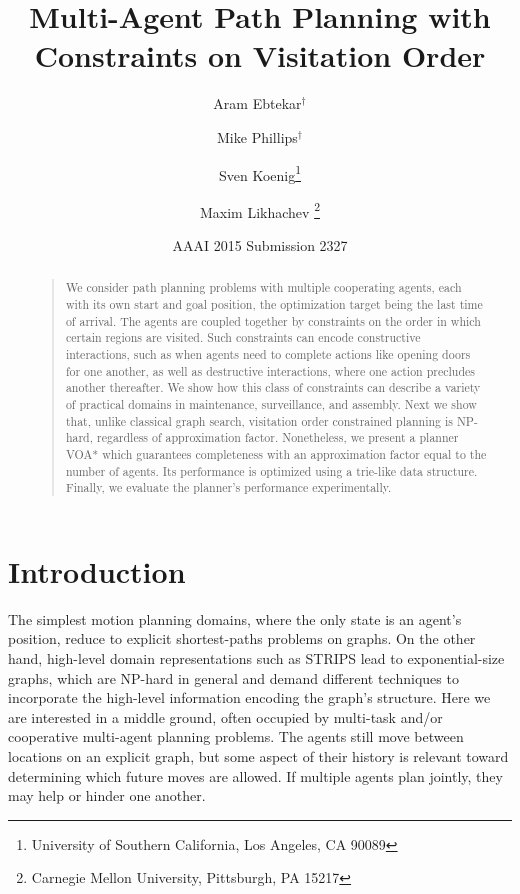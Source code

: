 \documentclass[letterpaper]{article}
\begin{document}
%
\title{Multi-Agent Path Planning with Constraints on Visitation Order}
\author{Aram Ebtekar$^\dagger$ \and Mike Phillips$^\dagger$ \and Sven Koenig\thanks{University of Southern California, Los Angeles, CA 90089} \and Maxim Likhachev%
\thanks{Carnegie Mellon University, Pittsburgh, PA 15217}%
%
}
\author{AAAI 2015 Submission 2327}%
\maketitle
\begin{abstract}
\begin{quote}
We consider path planning problems with multiple cooperating agents, each with its own start and goal position, the optimization target being the last time of arrival. The agents are coupled together by constraints on the order in which certain regions are visited. Such constraints can encode constructive interactions, such as when agents need to complete actions like opening doors for one another, as well as destructive interactions, where one action precludes another thereafter. We show how this class of constraints can describe a variety of practical domains in maintenance, surveillance, and assembly. Next we show that, unlike classical graph search, visitation order constrained planning is NP-hard, regardless of approximation factor. Nonetheless, we present a planner VOA* which guarantees completeness with an approximation factor equal to the number of agents. Its performance is optimized using a trie-like data structure. Finally, we evaluate the planner's performance experimentally.
\end{quote}
\end{abstract}

\section{Introduction}

The simplest motion planning domains, where the only state is an agent's position, reduce to explicit shortest-paths problems on graphs. On the other hand, high-level domain representations such as STRIPS lead to exponential-size graphs, which are NP-hard in general and demand different techniques to incorporate the high-level information encoding the graph's structure. Here we are interested in a middle ground, often occupied by multi-task and/or cooperative multi-agent planning problems. The agents still move between locations on an explicit graph, but some aspect of their history is relevant toward determining which future moves are allowed. If multiple agents plan jointly, they may help or hinder one another.
\end{document}
